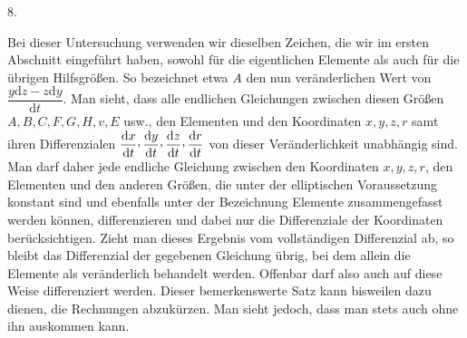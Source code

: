 \par{}\bigskip
{}
\begin{center}8.\end{center}
\noindent\hspace*{\parindent}Bei dieser Untersuchung verwenden wir dieselben Zeichen, die wir im ersten Abschnitt eingeführt haben, sowohl für die eigentlichen Elemente als auch für die übrigen Hilfsgrößen. So bezeichnet etwa \(A\) den nun veränderlichen Wert von \(\dfrac{y\mathrm{d}z-z\mathrm{d}y}{\mathrm{d}t}\). Man sieht, dass alle endlichen Gleichungen zwischen diesen Größen \(A,B,C,F,G,H,v,E\) usw., den Elementen und den Koordinaten \(x,y,z,r\) samt ihren Differenzialen \(\dfrac{\mathrm{d}x}{\mathrm{d}t}\mathpunct{\raisebox{.45ex}{,}}\dfrac{\mathrm{d}y}{\mathrm{d}t}\mathpunct{\raisebox{.45ex}{,}}\dfrac{\mathrm{d}z}{\mathrm{d}t}\mathpunct{\raisebox{.45ex}{,}}\dfrac{\mathrm{d}r}{\mathrm{d}t}\) von dieser Veränderlichkeit unabhängig sind. Man darf daher jede endliche Gleichung zwischen den Koordinaten \(x,y,z,r\), den Elementen und den anderen Größen, die unter der elliptischen Voraussetzung konstant sind und ebenfalls unter der Bezeichnung Elemente zusammengefasst werden können, differenzieren und dabei nur die Differenziale der Koordinaten berücksichtigen. Zieht man dieses Ergebnis vom vollständigen Differenzial ab, so bleibt das Differenzial der gegebenen Gleichung übrig, bei dem allein die Elemente als veränderlich behandelt werden. Offenbar darf also auch auf diese Weise differenziert werden. Dieser bemerkenswerte Satz kann bisweilen dazu dienen, die Rechnungen abzukürzen. Man sieht jedoch, dass man stets auch ohne ihn auskommen kann.
